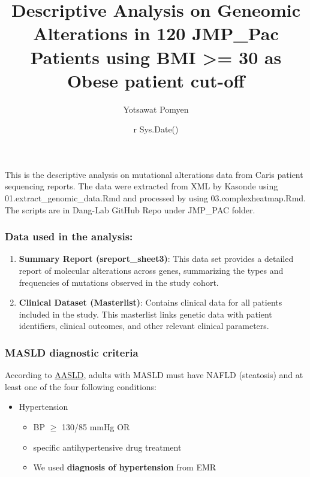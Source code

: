 \documentclass[
]{article}
\title{Descriptive Analysis on Geneomic Alterations in 120 JMP\_Pac
Patients using BMI \textgreater= 30 as Obese patient cut-off}
\author{Yotsawat Pomyen}
\date{r Sys.Date()}
\providecommand{\tightlist}{%
  \setlength{\itemsep}{0pt}\setlength{\parskip}{0pt}}
\begin{document}
\maketitle

This is the descriptive analysis on mutational alterations data from
Caris patient sequencing reports. The data were extracted from XML by
Kasonde using 01.extract\_genomic\_data.Rmd and processed by using
03.complexheatmap.Rmd. The scripts are in Dang-Lab GitHub Repo under
JMP\_PAC folder.

\hypertarget{data-used-in-the-analysis}{%
\subsubsection{Data used in the
analysis:}\label{data-used-in-the-analysis}}

\begin{enumerate}
\def\labelenumi{\arabic{enumi}.}
\item
  \textbf{Summary Report (sreport\_sheet3)}: This data set provides a
  detailed report of molecular alterations across genes, summarizing the
  types and frequencies of mutations observed in the study cohort.
\item
  \textbf{Clinical Dataset (Masterlist)}: Contains clinical data for all
  patients included in the study. This masterlist links genetic data
  with patient identifiers, clinical outcomes, and other relevant
  clinical parameters.
\end{enumerate}

\hypertarget{masld-diagnostic-criteria}{%
\subsubsection{MASLD diagnostic
criteria}\label{masld-diagnostic-criteria}}

According to \href{https://www.aasld.org/new-masld-nomenclature}{AASLD},
adults with MASLD must have NAFLD (steatosis) and at least one of the
four following conditions:

\begin{itemize}
\tightlist
\item
  Hypertension

  \begin{itemize}
  \tightlist
  \item
    BP \(\ge\) 130/85 mmHg OR
  \item
    specific antihypertensive drug treatment
  \item
    We used \textbf{diagnosis of hypertension} from EMR
  \end{itemize}
\end{itemize}
\end{document}
